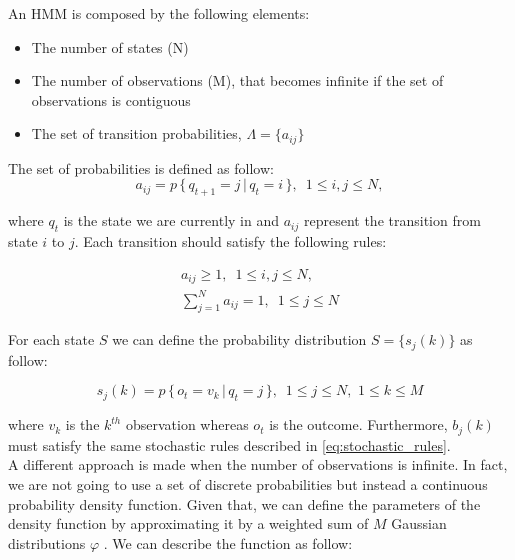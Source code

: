 \noindent An HMM is composed by the following elements:

\begin{itemize}
	\item The number of states (N)
	\item The number of observations (M), that becomes infinite if the set of observations is contiguous
	\item The set of transition probabilities, $\Lambda = \{ a_{ij}\}$
\end{itemize}

The set of probabilities is defined as follow:
\begin{equation}
\label{eq:transition_probabilities}
a_{ij} = p \, \{ \, q_{t+1} = j \, | \, q_{t} = i \, \}, \, \, \, 1 \leq i,j \leq N, 
\end{equation}

\noindent where $q_{t}$ is the state we are currently in and $a_{ij}$ represent the transition from state $i$ to $j$. 
Each transition should satisfy the following rules:

\begin{subequations}
	\label{eq:stochastic_rules}
	\begin{align}
	a_{ij} \geq 1, \, \, \, 1 \leq i,j \leq N, \\
	\sum_{j=1}^{N} a_{ij} = 1, \, \, \, 1 \leq j \leq N
	\end{align}
\end{subequations}

\noindent For each state $S$ we can define the probability distribution $S = \{s_{j}(k)\}$ as follow:

\begin{equation}
s_{j}(k) = p \, \{\, o_{t} = v_{k} \, | \, q_{t} = j \, \}, \, \, \, 1 \leq j \leq N, \,\, 1 \leq k \leq M
\end{equation}

\noindent where $v_k$ is the $k^{th}$ observation whereas $o_{t}$ is the outcome. Furthermore, $b_{j}(k)$ must satisfy the same stochastic rules described in \ref{eq:stochastic_rules}. \\

\noindent A different approach is made when the number of observations is infinite. In fact, we are not going to use a set of discrete probabilities but instead a continuous probability density function. Given that, we can define the parameters of the density function by approximating it by a weighted sum of $M$ Gaussian distributions $\varphi$ \cite{def_hmm}. We can describe the function as follow:

